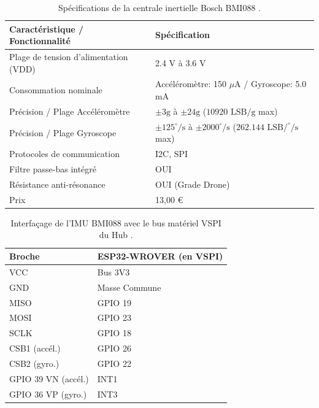 \begin{table}[H]
    \centering
    \begin{tabular}{|p{6cm}|p{8cm}|}
        \hline
        \textbf{Caractéristique / Fonctionnalité} & \textbf{Spécification} \\
        \hline
        Plage de tension d'alimentation (VDD) & 2.4 V à 3.6 V \\
        \hline
        Consommation nominale & Accéléromètre: 150 $\mu$A / Gyroscope: 5.0 mA \\
        \hline
        Précision / Plage Accéléromètre & $\pm 3\text{g}$ à $\pm 24\text{g}$ ($10920\text{ LSB/g}$ max) \\
        \hline
        Précision / Plage Gyroscope & $\pm 125^\circ/\text{s}$ à $\pm 2000^\circ/\text{s}$ ($262.144\text{ LSB/}^\circ\text{/s}$ max) \\
        \hline
        Protocoles de communication & I2C, SPI \\
        \hline
        Filtre passe-bas intégré & OUI \\
        \hline
        Résistance anti-résonance & OUI (Grade Drone) \\
        \hline
        Prix & 13,00 € \\
        \hline
    \end{tabular}
    \caption{Spécifications de la centrale inertielle Bosch BMI088 \cite{BMI088}.}
    \label{tab:specs_bmi088}
\end{table}

\begin{table}[H]
    \centering
    \begin{tabular}{|l|l|}
        \hline
        \textbf{Broche} & \textbf{ESP32-WROVER (en VSPI)} \\
        \hline
        VCC & Bus 3V3 \\
        \hline
        GND & Masse Commune \\
        \hline
        MISO & GPIO 19 \\
        \hline
        MOSI & GPIO 23 \\
        \hline
        SCLK & GPIO 18 \\
        \hline
        CSB1 (accél.) & GPIO 26 \\
        \hline
        CSB2 (gyro.) & GPIO 22 \\
        \hline
        GPIO 39 VN (accél.) & INT1 \\
        \hline
        GPIO 36 VP (gyro.) & INT3 \\
        \hline
    \end{tabular}
    \caption{Interfaçage de l'IMU BMI088 avec le bus matériel VSPI du Hub \cite{BMI088}.}
    \label{tab:pinout_bmi088}
\end{table}

